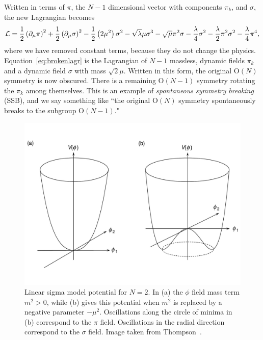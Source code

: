 Written in terms of $\pi$, the $N-1$ dimensional vector with components
$\pi_k$, and $\sigma$, the new Lagrangian becomes
\begin{equation}\label{eq:brokenlagr}
  \mathcal{L}=\frac{1}{2}\left(\partial_\mu\pi\right)^2
        +\frac{1}{2}\left(\partial_\mu\sigma\right)^2
        -\frac{1}{2}\left(2\mu^2\right)\sigma^2-\sqrt{\lambda}\mu\sigma^3
        -\sqrt\mu\pi^2\sigma
        -\frac{\lambda}{4}\sigma^2
        -\frac{\lambda}{2}\pi^2\sigma^2
        -\frac{\lambda}{4}\pi^4,
\end{equation}
where we have removed constant terms, because they do not change the
physics. Equation~\eqref{eq:brokenlagr} is the Lagrangian of $N-1$
massless, dynamic fields $\pi_k$ and a dynamic field $\sigma$ with mass
$\sqrt{2}\mu$. Written in this form, the original $\text{O}(N)$ symmetry
is now obscured. There is a remaining $\text{O}(N-1)$ symmetry
rotating the $\pi_k$ among themselves. This is an example of
{\it spontaneous symmetry breaking} (SSB), and we say something like
``the original $\text{O}(N)$ symmetry spontaneously breaks to
the subgroup $\text{O}(N-1)$." 

\begin{figure}[t]
\centering
\includegraphics[width=0.8\linewidth]{figs/symm_break.pdf}
\caption{Linear sigma model potential for $N=2$. In (a) the $\phi$ field
         mass term $m^2>0$, while (b) gives this potential when
         $m^2$ is replaced by a negative parameter $-\mu^2$.
         Oscillations along the circle of minima in (b) correspond to 
         the $\pi$ field. Oscillations in the radial direction correspond
         to the $\sigma$ field. Image taken from 
         Thompson~\cite{thomson_modern_2013}.}
\label{fig:ssb}
\end{figure}

